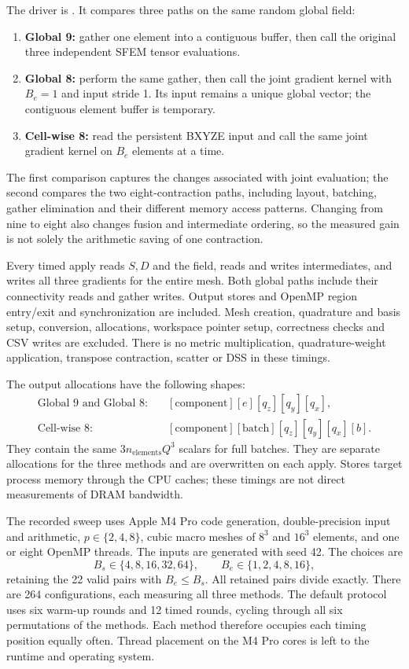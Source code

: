 \documentclass[11pt]{article}
\begin{document}
The driver is
.
It compares three paths on the same random global field:
\begin{enumerate}
 \item \textbf{Global 9:} gather one element into a contiguous buffer, then call
 the original three independent SFEM tensor evaluations.
 \item \textbf{Global 8:} perform the same gather, then call the joint gradient
 kernel with \(B_e=1\) and input stride 1. Its input remains a unique global
 vector; the contiguous element buffer is temporary.
 \item \textbf{Cell-wise 8:} read the persistent BXYZE input and call the same
 joint gradient kernel on \(B_e\) elements at a time.
\end{enumerate}
The first comparison captures the changes associated with joint evaluation;
the second compares the two eight-contraction paths, including layout,
batching, gather elimination and their different memory access patterns.
Changing from nine to eight also changes fusion and intermediate ordering, so
the measured gain is not solely the arithmetic saving of one contraction.

Every timed apply reads \(S,D\) and the field, reads and writes intermediates,
and writes all three gradients for the entire mesh. Both global paths include
their connectivity reads and gather writes. Output stores and OpenMP region
entry/exit and synchronization are included. Mesh creation, quadrature and basis
setup, conversion, allocations, workspace pointer setup, correctness checks and
CSV writes are excluded. There is no metric multiplication, quadrature-weight
application, transpose contraction, scatter or DSS in these timings.

The output allocations have the following shapes:
\[
\begin{aligned}
 \text{Global 9 and Global 8:}&\quad
 [\text{component}][e][q_z][q_y][q_x],\\
 \text{Cell-wise 8:}&\quad
 [\text{component}][\text{batch}][q_z][q_y][q_x][b].
\end{aligned}
\]
They contain the same \(3n_{\mathrm{elements}}Q^3\) scalars for full batches.
They are separate allocations for the three methods and are overwritten on
each apply. Stores target process memory through the CPU caches; these timings
are not direct measurements of DRAM bandwidth.

The recorded sweep uses Apple M4 Pro code generation, double-precision input
and arithmetic, \(p\in\{2,4,8\}\), cubic macro meshes of \(8^3\) and
\(16^3\) elements, and one or eight OpenMP threads. The inputs are generated
with seed 42. The choices are
\[
 B_s\in\{4,8,16,32,64\},\qquad B_e\in\{1,2,4,8,16\},
\]
retaining the 22 valid pairs with \(B_e\leq B_s\). All retained pairs divide
exactly. There are 264 configurations, each measuring all three methods.
The default protocol uses six warm-up rounds and 12 timed rounds, cycling
through all six permutations of the methods. Each method therefore occupies
each timing position equally often. Thread placement on the M4 Pro cores is
left to the runtime and operating system.
\end{document}
